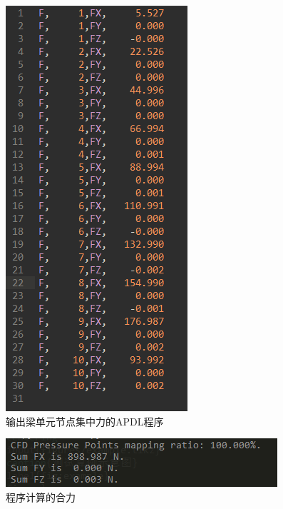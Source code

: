 \documentclass{ctexart}
\begin{document}
\begin{figure}[!htbp]
    \centering
    \includegraphics{figures/force.png}
    \caption{输出梁单元节点集中力的APDL程序}
    \label{fig:force}
\end{figure}

\begin{figure}[!htbp]
    \centering
    \includegraphics{figures/force_sum.png}
    \caption{程序计算的合力}
    \label{fig:force_sum}
\end{figure}

% 
% 
\end{document}
